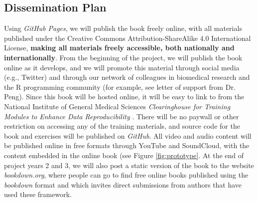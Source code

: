 \documentclass[pdftex,english,11pt,parskip=half]{scrartcl}
\begin{document}


\subsection{Dissemination Plan}

Using \textit{GitHub Pages}, we will publish the book freely online, with all materials published under the Creative Commons Attribution-ShareAlike 4.0 International License, \textbf{making all materials freely accessible, both nationally and internationally}. From the beginning of the project, we will publish the book online as it develops, and we will promote this material through social media (e.g., Twitter) and through our network of colleagues in biomedical research and the R programming community (for example, see letter of support from Dr. Peng). Since this book will be hosted online, it will be easy to link to from the National Institute of General Medical Sciences \textit{Clearinghouse for Training Modules to Enhance Data Reproducibility} \cite{clearinghouse}. There will be no paywall or other restriction on accessing any of the training materials, and source code for the book and exercises will be published on \textit{GitHub}. All video and audio content will be published online in free formats through YouTube and SoundCloud, with the content embedded in the online book (see Figure \ref{fig:prototype}. At the end of project years 2 and 3, we will also post a static version of the book to the website \textit{bookdown.org}, where people can go to find free online books published using the \textit{bookdown} format and which invites direct submissions from authors that have used these framework. 
\end{document}
